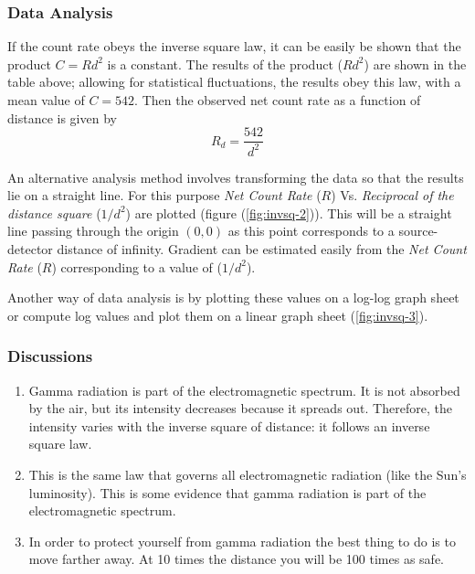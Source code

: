 \documentclass[%
 reprint,
nofootinbib,
 amsmath,amssymb,
 aps,
floatfix,
]{revtex4-2}
\begin{document}
        \subsubsection{Data Analysis}
        If the count rate obeys the inverse square law, it can be easily be shown that the product $C = R d^2$ is a constant. The results of the product ($Rd^2$) are shown in the table above; allowing for statistical fluctuations, the results obey this law, with a mean value of $C = 542$. Then the observed net count rate as a function of distance is given by
        \begin{equation}
            R_d = \dfrac{542}{d^2}
        \end{equation}
        \par
        An alternative analysis method involves transforming the data so that the results lie on a straight line. For this purpose \textit{Net Count Rate} ($R$) Vs. \textit{Reciprocal of the distance square} ($1/d^2$) are plotted (figure (\ref{fig:invsq-2})). This will be a straight line passing through the origin $(0, 0)$ as this point corresponds to a source-detector distance of infinity. Gradient can be estimated easily from the \textit{Net Count Rate} ($R$) corresponding to a value of ($1/d^2$).
        \par
        Another way of data analysis is by plotting these values on a log-log graph sheet or compute log values and plot them on a linear graph sheet (\ref{fig:invsq-3}). 
        \subsubsection{Discussions}
        \begin{enumerate}
            \item Gamma radiation is part of the electromagnetic spectrum. It is not absorbed by the air, but its intensity decreases because it spreads out. Therefore, the intensity varies with the inverse square of distance: it follows an inverse square law.
            \item This is the same law that governs all electromagnetic radiation (like the Sun's luminosity). This is some evidence that gamma radiation is part of the electromagnetic spectrum.
            \item In order to protect yourself from gamma radiation the best thing to do is to move farther away. At 10 times the distance you will be 100 times as safe.
        \end{enumerate}
\end{document}
